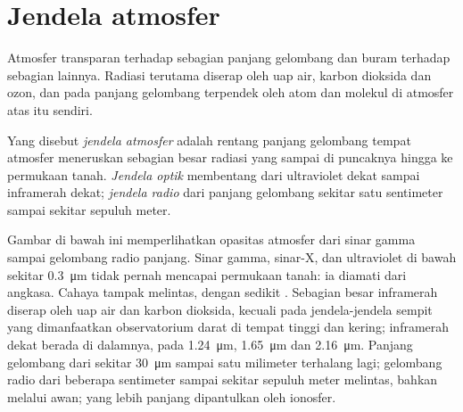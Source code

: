 \section{Jendela atmosfer}

Atmosfer transparan terhadap sebagian panjang gelombang dan buram terhadap sebagian lainnya. Radiasi terutama diserap oleh uap air, karbon dioksida dan ozon, dan pada panjang gelombang terpendek oleh atom dan molekul di atmosfer atas itu sendiri.

\begin{definition}\label{def:b1:observing-the-sky:window}
Yang disebut \emph{jendela atmosfer} adalah rentang panjang gelombang tempat atmosfer meneruskan sebagian besar radiasi yang sampai di puncaknya hingga ke permukaan tanah. \emph{Jendela optik} membentang dari ultraviolet dekat sampai inframerah dekat; \emph{jendela radio} dari panjang gelombang sekitar satu sentimeter sampai sekitar sepuluh meter.
\end{definition}

Gambar di bawah ini memperlihatkan opasitas atmosfer dari sinar gamma sampai gelombang radio panjang. Sinar gamma, sinar-X, dan ultraviolet di bawah sekitar \qty{0.3}{\micro\metre} tidak pernah mencapai permukaan tanah: ia diamati dari angkasa. Cahaya tampak melintas, dengan sedikit . Sebagian besar inframerah diserap oleh uap air dan karbon dioksida, kecuali pada jendela-jendela sempit yang dimanfaatkan observatorium darat di tempat tinggi dan kering;  inframerah dekat berada di dalamnya, pada \qty{1.24}{\micro\metre}, \qty{1.65}{\micro\metre} dan \qty{2.16}{\micro\metre}. Panjang gelombang dari sekitar \qty{30}{\micro\metre} sampai satu milimeter terhalang lagi; gelombang radio dari beberapa sentimeter sampai sekitar sepuluh meter melintas, bahkan melalui awan; yang lebih panjang dipantulkan oleh ionosfer.

